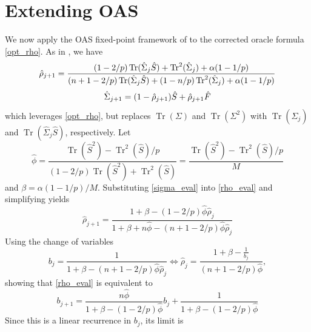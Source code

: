 \documentclass[10pt,twoside,titlepage]{article}
\begin{document}
\section{Extending OAS}\label{sec-extension}
We now apply the OAS fixed-point framework of \cite{OAS} to the corrected oracle formula \eqref{opt_rho}.
As in \cite{OAS}, we have
\begin{equation}
\label{rho_eval}
\hat{\rho}_{j+1} = \frac{ (1-2/p) \operatorname{Tr}(\hat{\Sigma}_j \hat{S} ) + \operatorname{Tr}^2( \hat{\Sigma}_j ) + \alpha (1 - 1/p) }{ (n+1-2/p) \operatorname{Tr}( \hat{\Sigma}_j \hat{S} ) + (1 - n/p) \operatorname{Tr}^2( \hat{\Sigma}_j ) + \alpha (1 - 1/p) } \\
\end{equation}
\begin{equation}
\label{sigma_eval}
\hat{\Sigma}_{j+1} = (1 - \hat{\rho}_{j+1}) \hat{S} + \hat{\rho}_{j+1} \hat{F} \\
\end{equation}
which leverages \eqref{opt_rho}, but replaces $\operatorname{Tr}(\Sigma)$ and $\operatorname{Tr}(\Sigma^2)$ with
$\operatorname{Tr}(\hat{\Sigma}_j)$ and $\operatorname{Tr}(\hat{\Sigma}_j \hat{S})$, respectively.
Let
\begin{equation}
\hat{\phi} = \frac{ \operatorname{Tr}( \hat{S}^2 ) - \operatorname{Tr}^2( \hat{S} ) / p }{ (1-2/p) \operatorname{Tr}( \hat{S}^2 ) + \operatorname{Tr}^2( \hat{S} ) } = \frac{ \operatorname{Tr}( \hat{S}^2 ) - \operatorname{Tr}^2( \hat{S} ) / p }{ M }
\end{equation}
and $\beta = \alpha (1 -  1/p) / M$.
Substituting \eqref{sigma_eval} into \eqref{rho_eval} and simplifying yields
\begin{equation}
\hat{\rho}_{j+1} = \frac{ 1 + \beta - (1 - 2/p) \hat{\phi} \hat{\rho}_j }{ 1 + \beta + n \hat{\phi} - (n+1-2/p) \hat{\phi} \hat{\rho}_j }
\end{equation}
Using the change of variables
\begin{equation}
b_j  = \frac{1}{ 1 + \beta - (n+1-2/p) \hat{\phi} \hat{\rho}_j } \Leftrightarrow \hat{\rho}_j = \frac{ 1 + \beta - \frac{1}{b_j} }{ (n+1-2/p) \hat{\phi} },
\end{equation}
showing that \eqref{rho_eval} is equivalent to
\begin{equation}
b_{j+1} =  \frac{  n \hat{\phi} }{ 1 + \beta - (1-2/p) \hat{\phi} } b_j + \frac{ 1 }{  1 + \beta - (1-2/p) \hat{\phi} }
\end{equation}
Since this is a linear recurrence in $b_j$, its limit is
\end{document}
